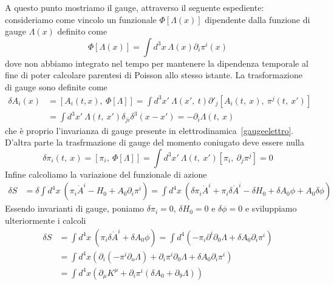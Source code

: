     A questo punto mostriamo il gauge, attraverso il seguente espediente: consideriamo come vincolo un funzionale $\Phi[\Lambda(x)]$ dipendente dalla funzione di gauge $\Lambda(x)$ definito come
\begin{equation*}
    \Phi[\Lambda(x)] = \int d^3 x ~ \Lambda(x) \partial_i \pi^i(x)
\end{equation*}
    dove non abbiamo integrato nel tempo per mantenere la dipendenza temporale al fine di poter calcolare parentesi di Poisson allo stesso istante. La trasformazione di gauge sono definite come 
\begin{equation*}
\begin{aligned}
    \delta A_i (x) & = [A_i(t, x), ~\Phi[\Lambda]] = \int d^3 x' ~ \Lambda(x', ~t) \partial'_j [A_i(t, ~x), ~ \pi^j(t, ~x')] \\ & = \int d^3 x' ~ \Lambda(t, ~x') \delta_{ji} \delta^3 (x-x') = - \partial_i \Lambda(t, ~x)
\end{aligned}
\end{equation*}
    che è proprio l'invarianza di gauge presente in elettrodinamica~\eqref{gaugeelettro}. D'altra parte la trasfrmazione di gauge del momento coniugato deve essere nulla 
\begin{equation*}
    \delta \pi_i(t, ~x) = [\pi_i, ~\Phi[\Lambda]] = \int d^3 x' ~ \Lambda(t, ~x')[\pi_i, ~\partial_j \pi^j] = 0
\end{equation*}
    Infine calcoliamo la variazione del funzionale di azione 
\begin{equation*}
\begin{aligned}
    \delta S & = \delta \int d^4 x ~ ( \pi_i \dot A^i - H_0 + A_0 \partial_i \pi^i) = \int d^4 x ~ ( \delta \pi_i \dot A^i + \pi_i \delta \dot A^i - \delta H_0 + \delta A_0 \phi + A_0 \delta \phi )
\end{aligned}
\end{equation*}
    Essendo invarianti di gauge, poniamo $\delta \pi_i = 0$, $\delta H_0 = 0$ e $\delta \phi = 0$ e sviluppiamo ulteriormente i calcoli
\begin{equation*}
\begin{aligned}
    \delta S & = \int d^4 x ~ (\pi_i \delta \dot A^i + \delta A_0 \phi) = \int d^4 (-\pi_i\partial^i \partial_0 \Lambda + \delta A_0 \partial_i \pi^i ) \\ & = \int d^4 x (\partial_i (-\pi^i \partial_o \Lambda) + \partial_i \pi^i \partial_0 \Lambda + \delta A_0 \partial_i \pi^i ) \\ & = \int d^4 x (\partial_\mu K^\mu + \partial_i \pi^i (\delta A_0 + \partial_9 \Lambda))
\end{aligned}
\end{equation*}
